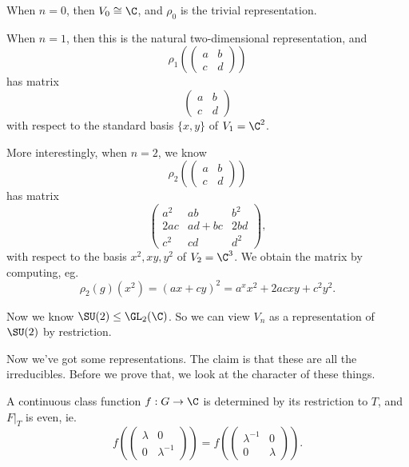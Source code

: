 \documentclass[a4paper]{article}
\begin{document}
\begin{eg}
  When $n = 0$, then $V_0 \cong \C$, and $\rho_0$ is the trivial representation.

  When $n = 1 $, then this is the natural two-dimensional representation, and
  \[
    \rho_1\left(
    \begin{pmatrix}
      a & b\\
      c & d
    \end{pmatrix}
    \right)
  \]
  has matrix
  \[
    \begin{pmatrix}
      a & b\\
      c & d
    \end{pmatrix}
  \]
  with respect to the standard basis $\{x, y\}$ of $V_1 = \C^2$.

  More interestingly, when $n = 2$, we know
  \[
    \rho_2\left(
    \begin{pmatrix}
      a & b\\
      c & d
    \end{pmatrix}
    \right)
  \]
  has matrix
  \[
    \begin{pmatrix}
      a^2 & ab & b^2\\
      2ac & ad + bc & 2bd\\
      c^2 & cd & d^2
    \end{pmatrix},
  \]
  with respect to the basis $x^2, xy, y^2$ of $V_2 = \C^3$. We obtain the matrix by computing, eg.
  \[
    \rho_2(g) (x^2) = (ax + cy)^2 = a^x x^2 + 2ac xy + c^2 y^2.
  \]
\end{eg}

Now we know $\SU(2) \leq \GL_2(\C)$. So we can view $V_n$ as a representation of $\SU(2)$ by restriction.

Now we've got some representations. The claim is that these are all the irreducibles. Before we prove that, we look at the character of these things.

\begin{lemma}
  A continuous class function $f: G \to \C$ is determined by its restriction to $T$, and $F|_T$ is even, ie.
  \[
    f\left(
    \begin{pmatrix}
      \lambda & 0\\
      0 & \lambda^{-1}
    \end{pmatrix}
    \right) =
    f\left(
    \begin{pmatrix}
      \lambda^{-1} & 0\\
      0 & \lambda
    \end{pmatrix}
    \right).
  \]
\end{lemma}
\end{document}
